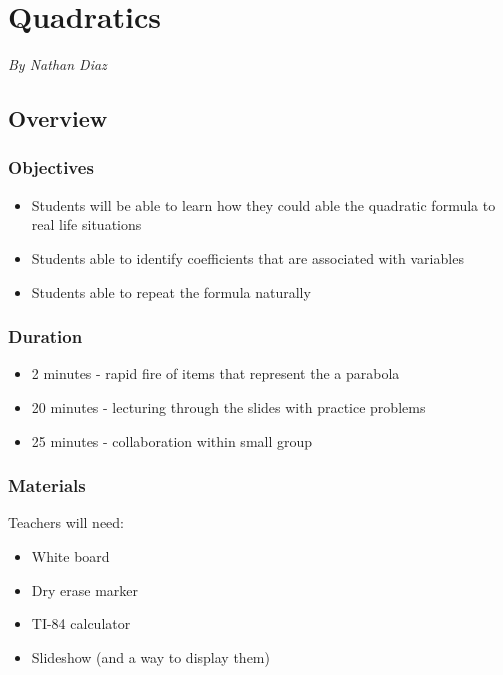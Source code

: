 \chapter{Quadratics}

\emph{By Nathan Diaz}

\section{Overview}

\subsection{Objectives}

\begin{itemize}
    \item Students will be able to learn how they could able the quadratic formula to real life situations
    \item Students able to identify coefficients that are associated with variables 
    \item Students able to repeat the formula naturally
\end{itemize}

\subsection{Duration}

\begin{itemize}
    \item 2 minutes - rapid fire of items that represent the a parabola 
    \item 20 minutes - lecturing through the slides with practice problems
    \item 25 minutes - collaboration within small group 
\end{itemize}

\subsection{Materials}

Teachers will need:
\begin{itemize}
    \item White board 
    \item Dry erase marker 
    \item TI-84 calculator 
    \item Slideshow (and a way to display them)
\end{itemize}

